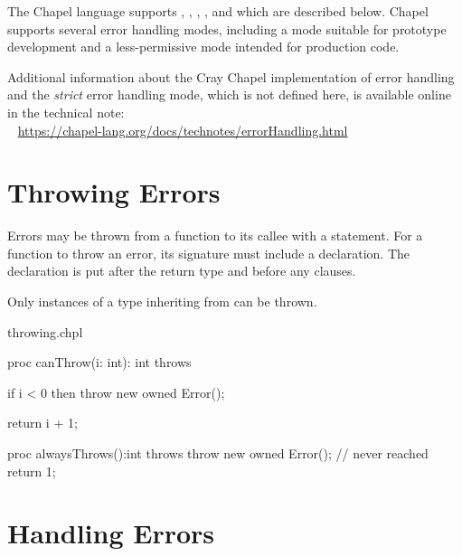 \label{Error_Handling}

The Chapel language supports , , ,
, and  which are described below. Chapel
supports several error handling modes, including a mode suitable
for prototype development and a less-permissive mode intended
for production code.

\begin{craychapel}
Additional information about the Cray Chapel implementation of
error handling and the \emph{strict} error handling mode, which
is not defined here, is available online in the technical note:
\\ %
\mbox{$$ $$ $$} %
\url{https://chapel-lang.org/docs/technotes/errorHandling.html}
\end{craychapel}


\section{Throwing Errors}
\label{Throwing_Errors}

Errors may be thrown from a function to its callee with a 
statement. For a function to throw an error, its signature must include
a  declaration. The declaration is put after the return
type and before any  clauses.

Only  instances of a type inheriting from  can be
thrown.

\begin{chapelexample}{throwing.chpl}
\begin{chapel}
proc canThrow(i: int): int throws {
  if i < 0 then
    throw new owned Error();

  return i + 1;
}

proc alwaysThrows():int throws {
  throw new owned Error();
  // never reached
  return 1;
}
\end{chapel}
\begin{chapelpost}
\end{chapelpost}
\begin{chapeloutput}
\end{chapeloutput}
\end{chapelexample}


\section{Handling Errors}
\label{Handling_Errors}

